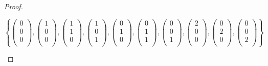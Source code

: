 \documentclass{article}
\begin{document}
\begin{proof}
\begin{itemize}
  $$
  \left\{
  \left(\begin{smallmatrix}0\\0\\0\\\end{smallmatrix}\right),
  \left(\begin{smallmatrix}1\\0\\0\\\end{smallmatrix}\right),
  \left(\begin{smallmatrix}1\\1\\0\\\end{smallmatrix}\right),
  \left(\begin{smallmatrix}1\\0\\1\\\end{smallmatrix}\right),
  \left(\begin{smallmatrix}0\\1\\0\\\end{smallmatrix}\right),
  \left(\begin{smallmatrix}0\\1\\1\\\end{smallmatrix}\right),
  \left(\begin{smallmatrix}0\\0\\1\\\end{smallmatrix}\right),
  \left(\begin{smallmatrix}2\\0\\0\\\end{smallmatrix}\right),
  \left(\begin{smallmatrix}0\\2\\0\\\end{smallmatrix}\right),
  \left(\begin{smallmatrix}0\\0\\2\\\end{smallmatrix}\right)
  \right\}
  $$


\end{itemize}
\end{proof}
\end{document}

